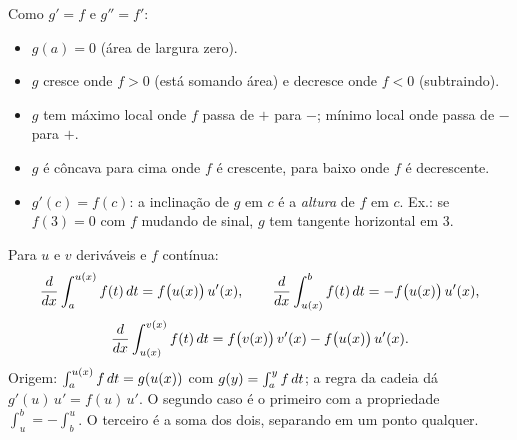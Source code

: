 \begin{definicao}[{Lendo o gráfico de $g(x)=\int_a^x f(t)\dt$ a partir do gráfico de $f$ (5.3.2--4, 83--84)}]
Como $g'=f$ e $g''=f'$:
\begin{itemize}[leftmargin=1.4em, itemsep=1pt]
\item $g(a)=0$ (área de largura zero).
\item $g$ cresce onde $f>0$ (está somando área) e decresce onde $f<0$ (subtraindo).
\item $g$ tem máximo local onde $f$ passa de $+$ para $-$; mínimo local onde passa de $-$ para $+$.
\item $g$ é côncava para cima onde $f$ é crescente, para baixo onde $f$ é decrescente.
\item $g'(c)=f(c)$: a inclinação de $g$ em $c$ é a \emph{altura} de $f$ em $c$. Ex.: se $f(3)=0$ com $f$ mudando de sinal, $g$ tem tangente horizontal em $3$.
\end{itemize}
\end{definicao}

\begin{definicao}
Para $u$ e $v$ deriváveis e $f$ contínua:
\[
\frac{d}{dx}\int_a^{u(x)}f(t)\,dt=f\big(u(x)\big)\,u'(x),
\qquad
\frac{d}{dx}\int_{u(x)}^{b}f(t)\,dt=-f\big(u(x)\big)\,u'(x),
\]
\[
\frac{d}{dx}\int_{u(x)}^{v(x)}f(t)\,dt=f\big(v(x)\big)\,v'(x)-f\big(u(x)\big)\,u'(x).
\]
Origem: $\int_a^{u(x)}f\,dt=g(u(x))$ com $g(y)=\int_a^y f\,dt$; a regra da cadeia dá $g'(u)\,u'=f(u)\,u'$. O segundo caso é o primeiro com a propriedade $\int_u^b=-\int_b^u$. O terceiro é a soma dos dois, separando em um ponto qualquer.
\end{definicao}

